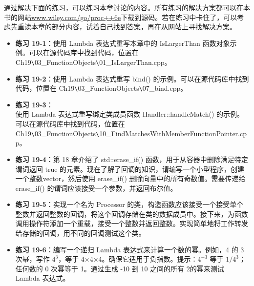 通过解决下面的练习，可以练习本章讨论的内容。所有练习的解决方案都可以在本书的网站\url{www.wiley.com/go/proc++6e}下载到源码。若在练习中卡住了，可以考虑先重读本章的部分内容，试着自己找到答案，再在从网站上寻找解决方案。

\begin{itemize}
\item
\textbf{练习 19-1}：使用 Lambda 表达式重写本章中的 IsLargerThan 函数对象示例。可以在源代码库中找到代码，位置在 Ch19\verb|\|03\_FunctionObjects\verb|\|01\_IsLargerThan.cpp。

\item
\textbf{练习 19-2}：使用 Lambda 表达式重写 bind() 的示例。可以在源代码库中找到代码，位置在 Ch19\verb|\|03\_FunctionObjects\verb|\|07\_bind.cpp。

\item
\textbf{练习 19-3}：\\使用 Lambda 表达式重写绑定类成员函数 Handler::handleMatch() 的示例。可以在源代码库中找到代码，位置在 Ch19\verb|\|03\_FunctionObjects\verb|\|10\_FindMatchesWithMemberFunctionPointer.cpp。

\item
\textbf{练习 19-4}：第 18 章介绍了 std::erase\_if() 函数，用于从容器中删除满足特定谓词返回 true 的元素。现在了解了回调的知识，请编写一个小型程序，创建一个整数vector，然后使用 erase\_if() 删除向量中的所有奇数值。需要传递给 erase\_if() 的谓词应该接受一个参数，并返回布尔值。

\item
\textbf{练习 19-5}：实现一个名为 Processor 的类，构造函数应该接受一个接受单个整数并返回整数的回调，将这个回调存储在类的数据成员中。接下来，为函数调用操作符添加一个重载，接受一个整数并返回整数。实现简单地将工作转发给存储的回调，用不同的回调测试这个类。

\item
\textbf{练习 19-6}：编写一个递归 Lambda 表达式来计算一个数的幂。例如，4 的 3 次幂，写作 $4^3$，等于 4×4×4。确保它适用于负指数。提示：$4^{-3}$ 等于 $1/4^3$；任何数的 0 次幂等于 1。通过生成 -10 到 10 之间的所有 2的幂来测试 Lambda 表达式。
\end{itemize}